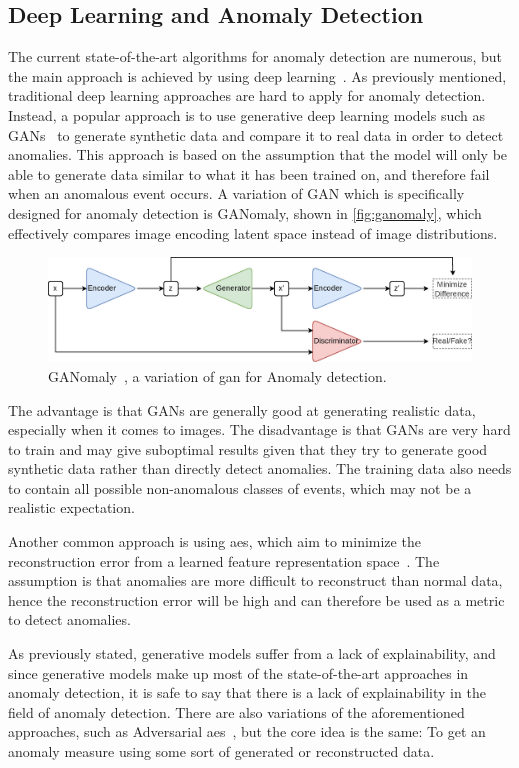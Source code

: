 \subsection{Deep Learning and Anomaly Detection}
\label{sec:dl_anom_detection}
The current state-of-the-art algorithms for anomaly detection are numerous, but the main approach is achieved by using deep learning~\cite{anomaly_detection}. As previously mentioned, traditional deep learning approaches are hard to apply for anomaly detection. Instead, a popular approach is to use generative deep learning models such as GANs~\cite{anomaly_detection, ganomaly,anomalyvideo} to generate synthetic data and compare it to real data in order to detect anomalies. This approach is based on the assumption that the model will only be able to generate data similar to what it has been trained on, and therefore fail when an anomalous event occurs. A variation of GAN which is specifically designed for anomaly detection is GANomaly\cite{ganomaly}, shown in \autoref{fig:ganomaly}, which effectively compares image encoding latent space instead of image distributions.
\begin{figure}[htb]
    \centering
    \includegraphics[width=\linewidth]{resources/related_works/ganomaly}
    \caption[GANomaly Visualization]{GANomaly~\cite{ganomaly}, a variation of \gls*{gan} for Anomaly detection.}
    \label{fig:ganomaly}
\end{figure}
\par
The advantage is that GANs are generally good at generating realistic data, especially when it comes to images. The disadvantage is that GANs are very hard to train and may give suboptimal results given that they try to generate good synthetic data rather than directly detect anomalies. The training data also needs to contain all possible non-anomalous classes of events, which may not be a realistic expectation.
\par

Another common approach is using \glspl*{ae}, which aim to minimize the reconstruction error from a learned feature representation space~\cite{autoencoder1,anomaly_detection,anomalyvideo}. The assumption is that anomalies are more difficult to reconstruct than normal data, hence the reconstruction error will be high and can therefore be used as a metric to detect anomalies.
\par
As previously stated, generative models suffer from a lack of explainability, and since generative models make up most of the state-of-the-art approaches in anomaly detection, it is safe to say that there is a lack of explainability in the field of anomaly detection. There are also variations of the aforementioned approaches, such as Adversarial \glspl*{ae}~\cite{adversarial_aes}, but the core idea is the same: To get an anomaly measure using some sort of generated or reconstructed data.

